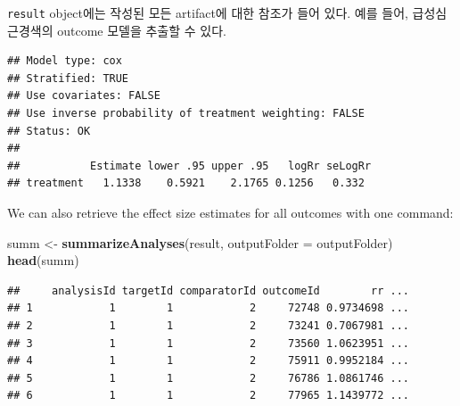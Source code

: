 \documentclass[11pt]{book}
\newenvironment{Shaded}{\begin{snugshade}}{\end{snugshade}}
\newcommand{\KeywordTok}[1]{\textcolor[rgb]{0.13,0.29,0.53}{\textbf{#1}}}
\newcommand{\DataTypeTok}[1]{\textcolor[rgb]{0.13,0.29,0.53}{#1}}
\newcommand{\DecValTok}[1]{\textcolor[rgb]{0.00,0.00,0.81}{#1}}
\newcommand{\StringTok}[1]{\textcolor[rgb]{0.31,0.60,0.02}{#1}}
\newcommand{\OperatorTok}[1]{\textcolor[rgb]{0.81,0.36,0.00}{\textbf{#1}}}
\newcommand{\NormalTok}[1]{#1}
\theoremstyle{definition}
\theoremstyle{definition}
\theoremstyle{definition}
\theoremstyle{remark}
\begin{document}
\texttt{result} object에는 작성된 모든 artifact에 대한 참조가 들어 있다.
예를 들어, 급성심근경색의 outcome 모델을 추출할 수 있다.

\begin{Shaded}
\end{Shaded}

\begin{verbatim}
## Model type: cox
## Stratified: TRUE
## Use covariates: FALSE
## Use inverse probability of treatment weighting: FALSE
## Status: OK
## 
##           Estimate lower .95 upper .95   logRr seLogRr
## treatment   1.1338    0.5921    2.1765 0.1256   0.332
\end{verbatim}

We can also retrieve the effect size estimates for all outcomes with one
command:

\begin{Shaded}
\begin{Highlighting}[]
\NormalTok{summ <-}\StringTok{ }\KeywordTok{summarizeAnalyses}\NormalTok{(result, }\DataTypeTok{outputFolder =}\NormalTok{ outputFolder)}
\KeywordTok{head}\NormalTok{(summ)}
\end{Highlighting}
\end{Shaded}

\begin{verbatim}
##     analysisId targetId comparatorId outcomeId        rr ...
## 1            1        1            2     72748 0.9734698 ...
## 2            1        1            2     73241 0.7067981 ...
## 3            1        1            2     73560 1.0623951 ...
## 4            1        1            2     75911 0.9952184 ...
## 5            1        1            2     76786 1.0861746 ...
## 6            1        1            2     77965 1.1439772 ...
\end{verbatim}
\end{document}
